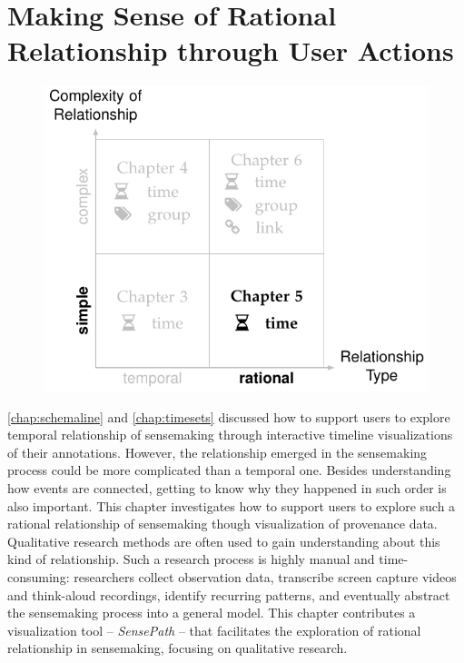 \chapter{Making Sense of Rational Relationship through User Actions}
\label{chap:sensepath}

\graphicspath{{Chapter5/figures/}}

\begin{figure}[!htb]
	\centering
	\includegraphics{work}
\end{figure}

\vspace{1in}


\pagebreak

\autoref{chap:schemaline} and \autoref{chap:timesets} discussed how to support users to explore temporal relationship of sensemaking through interactive timeline visualizations of their annotations. However, the relationship emerged in the sensemaking process could be more complicated than a temporal one. Besides understanding how events are connected, getting to know why they happened in such order is also important. This chapter investigates how to support users to explore such a rational relationship of sensemaking though visualization of provenance data. Qualitative research methods are often used to gain understanding about this kind of relationship. Such a research process is highly manual and time-consuming: researchers collect observation data, transcribe screen capture videos and think-aloud recordings, identify recurring patterns, and eventually abstract the sensemaking process into a general model. This chapter contributes a visualization tool -- \emph{SensePath} -- that facilitates the exploration of rational relationship in sensemaking, focusing on qualitative research.

